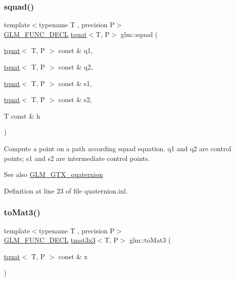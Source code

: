 \subsubsection{\texorpdfstring{squad()}{squad()}}
{\footnotesize\ttfamily template$<$typename T , precision P$>$ \\
\mbox{\hyperlink{setup_8hpp_ab2d052de21a70539923e9bcbf6e83a51}{G\+L\+M\+\_\+\+F\+U\+N\+C\+\_\+\+D\+E\+CL}} \mbox{\hyperlink{structglm_1_1tquat}{tquat}}$<$T, P$>$ glm\+::squad (\begin{DoxyParamCaption}\item[{\mbox{\hyperlink{structglm_1_1tquat}{tquat}}$<$ T, P $>$ const \&}]{q1,  }\item[{\mbox{\hyperlink{structglm_1_1tquat}{tquat}}$<$ T, P $>$ const \&}]{q2,  }\item[{\mbox{\hyperlink{structglm_1_1tquat}{tquat}}$<$ T, P $>$ const \&}]{s1,  }\item[{\mbox{\hyperlink{structglm_1_1tquat}{tquat}}$<$ T, P $>$ const \&}]{s2,  }\item[{T const \&}]{h }\end{DoxyParamCaption})}

Compute a point on a path according squad equation. q1 and q2 are control points; s1 and s2 are intermediate control points.

\begin{DoxySeeAlso}{See also}
\mbox{\hyperlink{group__gtx__quaternion}{G\+L\+M\+\_\+\+G\+T\+X\+\_\+quaternion}} 
\end{DoxySeeAlso}


Definition at line 23 of file quaternion.\+inl.

\mbox{\label{group__gtx__quaternion_ga01935b66ba245c2fd7dee5427d86ce9b}} 
\subsubsection{\texorpdfstring{toMat3()}{toMat3()}}
{\footnotesize\ttfamily template$<$typename T , precision P$>$ \\
\mbox{\hyperlink{setup_8hpp_ab2d052de21a70539923e9bcbf6e83a51}{G\+L\+M\+\_\+\+F\+U\+N\+C\+\_\+\+D\+E\+CL}} \mbox{\hyperlink{structglm_1_1tmat3x3}{tmat3x3}}$<$T, P$>$ glm\+::to\+Mat3 (\begin{DoxyParamCaption}\item[{\mbox{\hyperlink{structglm_1_1tquat}{tquat}}$<$ T, P $>$ const \&}]{x }\end{DoxyParamCaption})}

